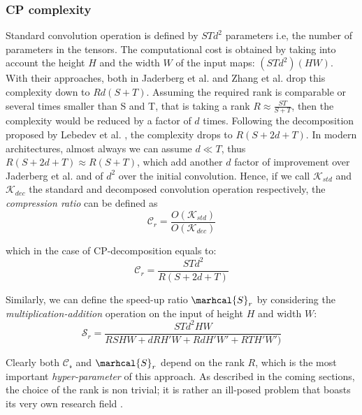\subsubsection{CP complexity}
Standard convolution operation is defined by $STd^2$ parameters i.e, the number of parameters in the tensors. The computational cost is obtained by taking into account the height $H$ and the width $W$ of the input maps: $(STd^2)(HW)$. 
\newline
With their approaches, both in Jaderberg et al.\parencite{jaderberg2014} and Zhang et al. \parencite{zhang2015SVD} drop this complexity down to $Rd(S+T)$. Assuming the required rank is comparable or several times smaller than S and T, that is taking a rank $R\approx \frac{ST}{S+T}$, then the complexity would be reduced by a factor of $d$ times. 
\newline 
Following the decomposition proposed by Lebedev et al. \parencite{lebedev2014}, the complexity drops to $R(S+2d+T)$. In modern architectures, almost always we can assume $d\ll T$, thus $R(S+2d+T) \approx R(S+T)$,  which add another $d$ factor of improvement over Jaderberg et al. and of $d^2$ over the initial convolution. \newline
Hence, if we call $\mathcal{K}_{std}$ and $\mathcal{K}_{dec}$ the standard and decomposed convolution operation respectively,  the \emph{compression ratio} can be defined as
\begin{equation}
    \mathbf{\mathcal{C}}_r = \frac{O(\mathcal{K}_{std})}{O(\mathcal{K}_{dec})}
\end{equation}

which in the case of CP-decomposition equals to: 
\begin{equation}
    \mathcal{C}_r = \frac{STd^2}{R(S+2d+T)}    
\end{equation}

Similarly, we can define the speed-up ratio $\marhcal{S}_r$ by considering the \emph{multiplication-addition} operation on the input of height $H$ and width $W$: 
\begin{equation}
    \mathcal{S}_r = \frac{STd^2HW}{RSHW + dRH'W + RdH'W'+ RTH'W')}    
\end{equation}


Clearly both $\mathcal{C_r}$ and $\marhcal{S}_r$ depend on the rank $R$, which is the most important \emph{hyper-parameter} of this approach. As described in the coming sections, the choice of the rank is non trivial; it is rather an ill-posed problem that boasts its very own research field \parencite{rank-hard1}. 

